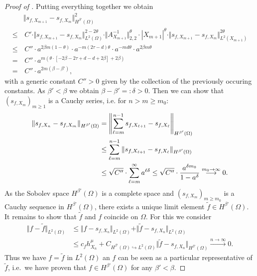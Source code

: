 \documentclass[a4paper, 10pt]{article}
\begin{document}
\begin{proof}[Proof of ]
\noindent Putting everything together we obtain %
\begin{align*}
&\Vert s_{f, X_{m+1}} - s_{f, X_{m}} \Vert_{H^{\beta'}(\Omega)}^2 \\
\leq &\, C' \cdot \Vert s_{f, X_{m+1}} - s_{f, X_{m}} \Vert_{L^2(\Omega)}^{2 - 2\theta} \cdot \Vert A_{X_{m+1}}^{-1} \Vert_{2,2}^{\theta} \cdot |X_{m+1}|^{\theta} \cdot  \Vert s_{f, X_{m+1}} - s_{f, X_{m}} \Vert_{L^2(X_{m+1})}^{2\theta} \\
\leq &\,C'' \cdot a^{2\beta m (1-\theta)} \cdot a^{-m (2\tau - d) \theta} \cdot a^{-md \theta} \cdot a^{2\beta m \theta} \\
= &\,C'' \cdot a^{m(\theta \cdot [-2\beta - 2\tau + d - d + 2\beta] + 2\beta)} \\
= &\,C'' \cdot a^{2m(\beta-\beta')},
\end{align*}
with a generic constant $C'' > 0$ given by the collection of the previously occuring constants. %
%
%
%
As $\beta' < \beta$ we obtain $\beta - \beta' =: \delta > 0$.
Then we can show that $(s_{f, X_m})_{m \geq 1}$ is a Cauchy series, i.e. for $n > m \geq m_0$:
\begin{align}
\label{eq:cauchy_sequence_calculation}
\Vert s_{f, X_{n}} - s_{f, X_m} \Vert_{H^{\beta'}(\Omega)} &= \left \Vert \sum_{\ell=m}^{n-1} s_{f, X_{\ell+1}} - s_{f, X_{\ell}} \right \Vert_{H^{\beta'}(\Omega)} \notag \\
&\leq \sum_{\ell=m}^{n-1} \Vert s_{f, X_{\ell+1}} - s_{f, X_{\ell}} \Vert_{H^{\beta'}(\Omega)} \notag \\
&\leq \sqrt{C''} \cdot \sum_{\ell=m}^{\infty} a^{\ell\delta} 
\leq \sqrt{C''} \cdot \frac{a^{\delta m_0}}{1 - a^{\delta}} \stackrel{m_0 \rightarrow \infty}{\longrightarrow} 0.
\end{align}
As the Sobolev space $H^{\beta'}(\Omega)$ is a complete space and $(s_{f, X_m})_{m \geq m_0}$ is a Cauchy sequence in $H^{\beta'}(\Omega)$, 
there exists a unique limit element $\tilde{f} \in H^{\beta'}(\Omega)$. \\
It remains to show that $\tilde{f}$ and $f$ coincide on $\Omega$. 
For this we consider
\begin{align*}
\Vert f - \tilde{f} \Vert_{L^2(\Omega)} %
&\leq \Vert f - s_{f, X_n} \Vert_{L^2(\Omega)} + \Vert \tilde{f} - s_{f, X_n} \Vert_{L^2(\Omega)} \\
&\leq c_f h_{X_n}^{\mu} + C_{H^{\beta'}(\Omega) \hookrightarrow L^2(\Omega)} \Vert \tilde{f} - s_{f, X_n} \Vert_{H^{\beta'}(\Omega)} \stackrel{n \rightarrow \infty}{\longrightarrow} 0.
\end{align*}
Thus we have $f = \tilde{f}$ in $L^2(\Omega)$ an $f$ can be seen as a particular representative of $\tilde{f}$, 
i.e.\ we have proven that $f \in H^{\beta'}(\Omega)$ for any $\beta' < \beta$. 
\end{proof}
\end{document}

